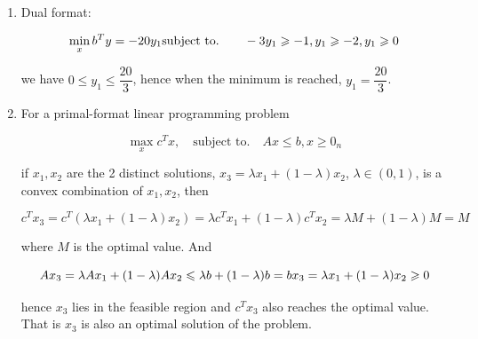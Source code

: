 \documentclass[
]{article}
\begin{document}
\begin{enumerate}
\def\labelenumi{\arabic{enumi}.}
\item
  Dual format:

  \[\min_x b^Ty=-20y_1\\

  \text{subject to.}\qquad-3y_1\geqslant -1,y_1\geqslant  -2,y_1\geqslant 0\]

  we have \(0\leqslant y_1\leqslant\dfrac{20}{3}\), hence when the
  minimum is reached, \(y_1=\dfrac{20}{3}\).
\item
  For a primal-format linear programming problem

  \[\max_x c^Tx,\quad \text{subject to.}\quad Ax\leqslant b,x\geqslant 0_n\]

  if \(x_1,x_2\) are the 2 distinct solutions,
  \(x_3=\lambda x_1+(1-\lambda)x_2\), \(\lambda \in (0,1)\), is a convex
  combination of \(x_1,x_2\), then

  \[c^Tx_3=c^T(\lambda x_1+(1-\lambda)x_2)=\lambda c^Tx_1+(1-\lambda)c^Tx_2=\lambda M+(1-\lambda)M=M\]

  where \(M\) is the optimal value. And

  \[Ax_3=\lambda Ax_1+(1-\lambda)Ax_2\leqslant \lambda b+(1-\lambda )b=b\\

  x_3=\lambda x_1+(1-\lambda)x_2\geqslant 0\]

  hence \(x_3\) lies in the feasible region and \(c^Tx_3\) also reaches
  the optimal value. That is \(x_3\) is also an optimal solution of the
  problem.
\end{enumerate}
\end{document}
